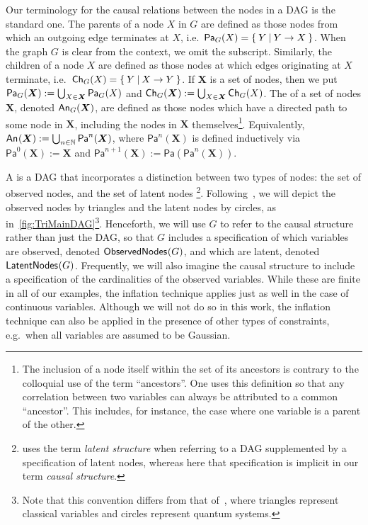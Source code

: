 \documentclass[aps,english,10pt,superscriptaddress,onecolumn,twoside,longbibliography,pra,floatfix,fleqn,nofootinbib]{revtex4-1}
\newcommand*{\tblue}[1]{{\color{medblue}{\textbf{#1}}}}
\theoremstyle{definition}
\newcounter{example}[section]
\newcommand{\An}[2][]{{\mathsf{An}_{#1}}\parenths{#2}}
\newcommand{\Pa}[2][]{{\mathsf{Pa}_{#1}}\parenths{#2}}
\newcommand{\Ch}[2][]{{\mathsf{Ch}_{#1}}\parenths{#2}}
\newcommand{\SmallNamedFunction}[3][]{\operatorname{\mathsf{#2}}_{#1}\parenths{#3}}
\newcommand{\obsnodes}[1]{\SmallNamedFunction{ObservedNodes}{#1}}
\newcommand{\latnodes}[1]{\SmallNamedFunction{LatentNodes}{#1}}
\DeclarePairedDelimiter{\parenths}{\lparen}{\rparen}
\begin{document}
Our terminology for the causal relations between the nodes in a DAG is the standard one. The parents of a node $X$ in $G$ are defined as those nodes from which an outgoing edge terminates at $X$, i.e.~$\Pa[G]{X} = \{\:Y\:|\:Y\to X\:\}$. When the graph $G$ is clear from the context, we omit the subscript. Similarly, the children of a node $X$ are defined as those nodes at which edges originating at $X$ terminate, i.e.~$\Ch[G]{X} = \{\:Y\:|\: X\to Y\:\}$. If $\bm{X}$ is a set of nodes, then we put $\Pa[G]{\bm{X}} := \bigcup_{X\in\bm{X}} \Pa[G]{X}$ and $\Ch[G]{\bm{X}} := \bigcup_{X\in\bm{X}} \Ch[G]{X}$. The \tblue{ancestors} of a set of nodes $\bm{X}$, denoted $\An[G]{\bm{X}}$, are defined as those nodes which have a directed path to some node in $\bm{X}$, including the nodes in $\bm{X}$ themselves\footnote{The inclusion of a node itself within the set of its ancestors is contrary to the colloquial use of the term ``ancestors''. 
One uses this definition so that any correlation between two variables can always be attributed to a common ``ancestor''. This includes, for instance, the case where one variable is a parent of the other.
}. 
Equivalently, $\An{\bm{X}} := \bigcup_{n\in\mathbb{N}} \mathsf{Pa}^n(\bm{X})$, where $\mathsf{Pa}^n(\bm{X})$ is defined inductively via $\mathsf{Pa}^0(\bm{X}) := \bm{X}$ and $\mathsf{Pa}^{n+1}(\bm{X}) := \mathsf{Pa}(\mathsf{Pa}^n(\bm{X}))$. 

A \tblue{causal structure} is a DAG that incorporates a distinction between two types of nodes: the set of observed nodes, 
and the set of latent nodes \footnote{\citet[Def. 2.3.2]{pearl2009causality} uses the term \emph{latent structure} when referring to a DAG supplemented by a specification of latent nodes, whereas here that specification is implicit in our term \emph{causal structure}.}. 
Following~\cite{pusey2014gdag}, we will depict the observed nodes by triangles and the latent nodes by circles, as in~\cref{fig:TriMainDAG}\footnote{Note that this convention differs from that of~\cite{leifer2013conditionalstates}, where triangles represent classical variables and circles represent quantum systems.}. Henceforth, we will use $G$ to refer to the causal structure rather than just the DAG, so that $G$ includes a specification of which variables are observed, denoted $\obsnodes{G}$, and which are latent, denoted $\latnodes{G}$.
Frequently, we will also imagine the causal structure to include a specification of the cardinalities of the observed variables. While these are finite in all of our examples, the inflation technique applies just as well in the case of continuous variables. 
Although we will not do so in this work, the inflation technique can also be applied in the presence of other types of constraints, e.g.~when all variables are assumed to be Gaussian. 
\end{document}
